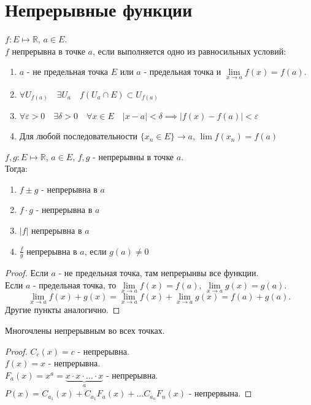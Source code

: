 \documentclass[11pt, oneside]{article}   	%
\begin{document}
\section{Непрерывные функции}
    \begin{definition}
        $f: E \mapsto \mathbb{R}$, $a\in E$.\\
        $f$ непрерывна в точке $a$, если выполняется одно из равносильных условий:
        \begin{enumerate}
            \item $a$ - не предельная точка $E$ или $a$ - предельная точка и $\lim\limits_{x \to a} f(x) = f(a)$.
            \item $\forall{U_{f(a)}}\quad \exists{U_a}\quad f(U_a\cap E) \subset U_{f(a)}$
            \item $\forall{\varepsilon>0}\quad \exists{\delta>0}\quad \forall{x\in E}\quad |x-a|<\delta \implies |f(x)-f(a)| < \varepsilon$
            \item Для любой последовательности $\{x_n\in E\} \to a $, $\lim f(x_n) = f(a) $
        \end{enumerate}
    \end{definition}
    \begin{theorem}
        $f, g : E \mapsto \mathbb{R}$, $a\in E$, $f,g$ - непрерывны в точке $a$.\\
        Тогда:
        \begin{enumerate}
            \item $f\pm g$ - непрерывна в $a$
            \item $f\cdot g$ - непрерывна в $a$
            \item $|f|$ непрерывна в $a$
            \item $ \frac{f}{g}$ непрерывна в $a$, если $g(a) \neq 0$
        \end{enumerate}
        \begin{proof}
            Если $a$ - не предельная точка, там непрерынвы все функции.\\
            Если $a$ - предельная точка, то $\lim\limits_{x \to a} f(x) = f(a)$, $\lim\limits_{x \to a} g(x) = g(a)$.
            \[ \lim\limits_{x \to a} f(x)+g(x) = \lim\limits_{x \to a} f(x) + \lim\limits_{x \to a} g(x) = f(a) + g(a) .\]
            Другие пункты аналогично.
        \end{proof}
    \end{theorem}
    \begin{tlemma}
        Многочлены непрерывным во всех точках.
        \begin{proof}
            $C_c(x) = c$ - непрерывна.\\
            $f(x) = x$ - непрерывна.\\
            $F_a(x) = x^{a} = \underbrace{x\cdot x\cdot \ldots\cdot x}_{a} $ - непрерывна.\\
            $P(x) = C_{a_1}(x) + C_{a_1}F_{a}(x) + \ldots C_{a_n}F_n(x)$ - непрервына.
        \end{proof}
    \end{tlemma}
\end{document}
